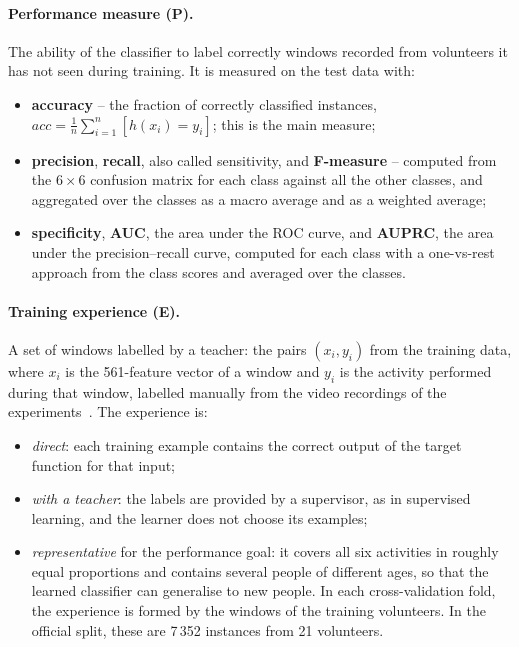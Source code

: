 \documentclass[a4paper, 11pt]{article}
\begin{document}
\paragraph{Performance measure (P).} The ability of the classifier to label correctly windows recorded from volunteers it has not seen during training. It is measured on the test data with:
\begin{itemize}[itemsep=2pt]
  \item \textbf{accuracy} -- the fraction of correctly classified instances, $acc = \frac{1}{n}\sum_{i=1}^{n} [h(x_i) = y_i]$; this is the main measure;
  \item \textbf{precision}, \textbf{recall}, also called sensitivity, and \textbf{F-measure} -- computed from the $6 \times 6$ confusion matrix for each class against all the other classes, and aggregated over the classes as a macro average and as a weighted average;
  \item \textbf{specificity}, \textbf{AUC}, the area under the ROC curve, and \textbf{AUPRC}, the area under the precision--recall curve, computed for each class with a one-vs-rest approach from the class scores and averaged over the classes.
\end{itemize}

\paragraph{Training experience (E).} A set of windows labelled by a teacher: the pairs $(x_i, y_i)$ from the training data, where $x_i$ is the 561-feature vector of a window and $y_i$ is the activity performed during that window, labelled manually from the video recordings of the experiments~\cite{anguita2013}. The experience is:
\begin{itemize}[itemsep=2pt]
  \item \emph{direct}: each training example contains the correct output of the target function for that input;
  \item \emph{with a teacher}: the labels are provided by a supervisor, as in supervised learning, and the learner does not choose its examples;
  \item \emph{representative} for the performance goal: it covers all six activities in roughly equal proportions and contains several people of different ages, so that the learned classifier can generalise to new people. In each cross-validation fold, the experience is formed by the windows of the training volunteers. In the official split, these are 7\,352 instances from 21 volunteers.
\end{itemize}



\end{document}
